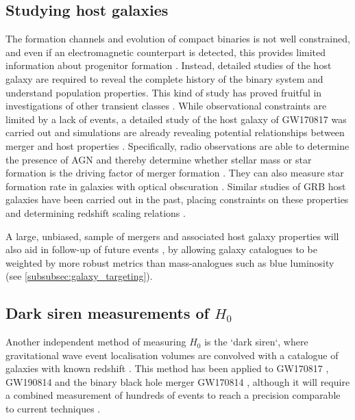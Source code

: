 \subsection{Studying host galaxies}
\label{subsec:host_galaxies}
\vspace{-3pt}
The formation channels and evolution of compact binaries is not well constrained, and even if an electromagnetic counterpart is detected, this provides limited information about progenitor formation \citep{2017MNRAS.464.2831O}. Instead, detailed studies of the host galaxy are required to reveal the complete history of the binary system and understand population properties. This kind of study has proved fruitful in investigations of other transient classes \citep[e.g.][]{2000AJ....120.1479H,2006ApJ...648..868S,2008AJ....135.1136M,2009ApJ...690..231B,2010AJ....139..694L,2019Sci...365..565B,2020ApJ...895L..37B}. While observational constraints are limited by a lack of events, a detailed study of the host galaxy of GW170817 was carried out \citep{2017ApJ...848L..22B,2017ApJ...849L..16I,2017ApJ...848L..28L,2017ApJ...848L..30P,2020A&A...634A..73E,2018A&A...620A..37C} and simulations are already revealing potential relationships between merger and host properties \citep[e.g.][]{2019MNRAS.489.4622T,2019MNRAS.487.1675A,2020MNRAS.491.3419A}. Specifically, radio observations are able to determine the presence of AGN and thereby determine whether stellar mass or star formation is the driving factor of merger formation \citep{2007ApJ...665.1220Z,2017arXiv171106873C}. They can also measure star formation rate in galaxies with optical obscuration \citep{2013ApJ...778..172P}. Similar studies of GRB host galaxies have been carried out in the past, placing constraints on these properties and determining redshift scaling relations  \citep[e.g.][]{2019ApJ...887..206K,2014MNRAS.444.2133S,2018ApJ...865...82Z}. 

A large, unbiased, sample of mergers and associated host galaxy properties will also aid in follow-up of future events \citep[e.g.][]{2020arXiv200101025A}, by allowing galaxy catalogues to be weighted by more robust metrics than mass-analogues such as blue luminosity (see \ref{subsubsec:galaxy_targeting}).

\vspace{-5pt}
\subsection{Dark siren measurements of $H_0$}
\label{subsec:dark_siren}
\vspace{-5pt}
Another independent method of measuring $H_0$ is the `dark siren`, where gravitational wave event localisation volumes are convolved with a catalogue of galaxies with known redshift \citep{1986Natur.323..310S,2012PhRvD..86d3011D}. This method has been applied to GW170817 \citep{2019ApJ...871L..13F}, GW190814 \citep{2020ApJ...896L..44A} and the binary black hole merger GW170814 \citep{2017PhRvL.119n1101A,2019ApJ...876L...7S}, although it will require a combined measurement of hundreds of events to reach a precision comparable to current techniques \citep{2018Natur.562..545C}.

